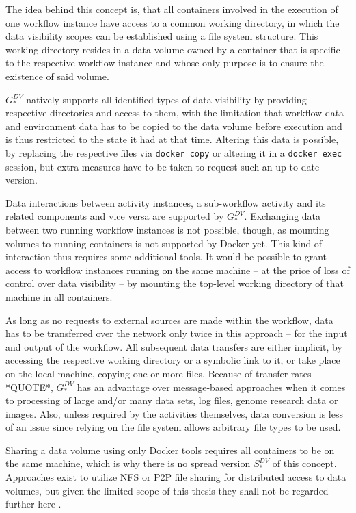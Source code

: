  The idea behind this concept is, that all containers involved in the execution of one workflow instance have access to a common working directory, in which the data visibility scopes can be established using a file system structure. This working directory resides in a data volume owned by a container that is specific to the respective workflow instance and whose only purpose is to ensure the existence of said volume.

  $G_{*}^{DV}$ natively supports all identified types of data visibility by providing respective directories and access to them, with the limitation that workflow data and environment data has to be copied to the data volume before execution and is thus restricted to the state it had at that time. Altering this data is possible, \eg by replacing the respective files via \texttt{docker copy} or altering it in a \texttt{docker exec} session, but extra measures have to be taken to request such an up-to-date version.

  Data interactions between activity instances, a sub-workflow activity and its related components and vice versa are supported by $G_{*}^{DV}$. Exchanging data between two running workflow instances is not possible, though, as mounting volumes to running containers is not supported by Docker yet. This kind of interaction thus requires some additional tools. It would be possible to grant access to workflow instances running on the same machine -- at the price of loss of control over data visibility -- by mounting the top-level working directory of that machine in all containers.

  As long as no requests to external sources are made within the workflow, data has to be transferred over the network only twice in this approach -- for the input and output of the workflow. All subsequent data transfers are either implicit, \eg by accessing the respective working directory or a symbolic link to it, or take place on the local machine, \eg copying one or more files. Because of transfer rates *QUOTE*, $G_{*}^{DV}$ has an advantage over message-based approaches when it comes to processing of large and/or many data sets, \ie log files, genome research data or images. Also, unless required by the activities themselves, data conversion is less of an issue since relying on the file system allows arbitrary file types to be used.

  Sharing a data volume using only Docker tools requires all containers to be on the same machine, which is why there is no spread version $S_{*}^{DV}$ of this concept. Approaches exist to utilize \ac{NFS} or \ac{P2P} file sharing for distributed access to data volumes, but given the limited scope of this thesis they shall not be regarded further here \cite{Miell2015How}.

